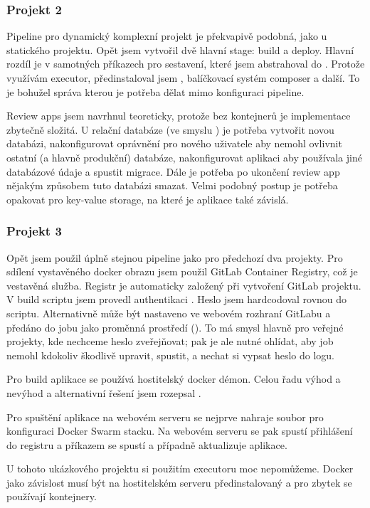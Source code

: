         \subsubsection{Projekt 2}
            Pipeline pro dynamický komplexní projekt je překvapivě podobná, jako u statického projektu. Opět jsem vytvořil dvě hlavní stage: build a deploy. Hlavní rozdíl je v samotných příkazech pro sestavení, které jsem abstrahoval do . Protože využívám  executor, předinstaloval jsem , balíčkovací systém composer a další. To je bohužel správa kterou je potřeba dělat mimo konfiguraci pipeline.

            Review apps jsem navrhnul teoreticky, protože bez kontejnerů je implementace zbytečně složitá. U relační databáze (ve smyslu ) je potřeba vytvořit novou databázi, nakonfigurovat oprávnění pro nového uživatele aby nemohl ovlivnit ostatní (a hlavně produkční) databáze, nakonfigurovat aplikaci aby používala jiné databázové údaje a spustit migrace. Dále je potřeba po ukončení review app nějakým způsobem tuto databázi smazat. Velmi podobný postup je potřeba opakovat pro key-value storage, na které je aplikace také závislá.

        \subsubsection{Projekt 3}
            Opět jsem použil úplně stejnou pipeline jako pro předchozí dva projekty. Pro sdílení vystavěného docker obrazu jsem použil GitLab Container Registry, což je vestavěná služba. Registr je automaticky založený při vytvoření GitLab projektu. V build scriptu jsem provedl authentikaci . Heslo jsem hardcodoval rovnou do scriptu. Alternativně může být nastaveno ve webovém rozhraní GitLabu a předáno do jobu jako proměnná prostředí (). To má smysl hlavně pro veřejné projekty, kde nechceme heslo zveřejňovat; pak je ale nutné ohlídat, aby \CI job nemohl kdokoliv škodlivě upravit, spustit, a nechat si vypsat heslo do logu.

            Pro build aplikace se používá hostitelský docker démon. Celou řadu výhod a nevýhod a alternativní řešení jsem rozepsal .

            Pro spuštění aplikace na webovém serveru se nejprve nahraje soubor pro konfiguraci Docker Swarm stacku. Na webovém serveru se pak spustí přihlášení do registru a příkazem  se spustí a případně aktualizuje aplikace.

            U tohoto ukázkového projektu si použitím  executoru moc nepomůžeme. Docker jako závislost musí být na hostitelském serveru předinstalovaný a pro zbytek se používají kontejnery.
